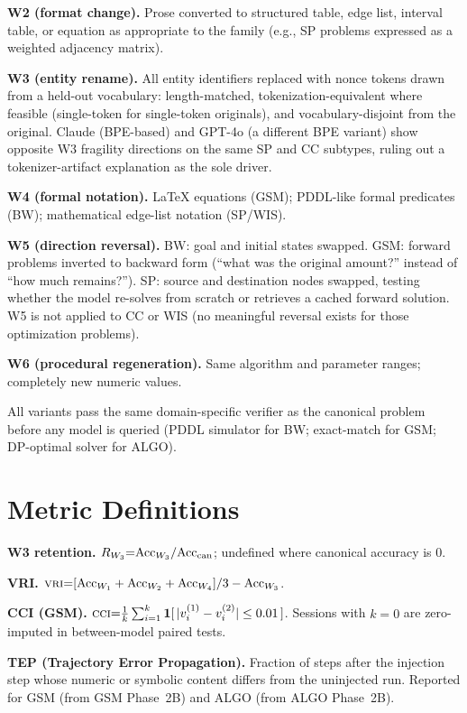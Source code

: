 \textbf{W2 (format change).} Prose converted to structured table, edge list,
interval table, or equation as appropriate to the family (e.g., SP problems
expressed as a weighted adjacency matrix).

\textbf{W3 (entity rename).} All entity identifiers replaced with nonce
tokens drawn from a held-out vocabulary: length-matched,
tokenization-equivalent where feasible (single-token for single-token
originals), and vocabulary-disjoint from the original. Claude (BPE-based) and
GPT-4o (a different BPE variant) show opposite W3 fragility directions on the
same SP and CC subtypes, ruling out a tokenizer-artifact explanation as the
sole driver.

\textbf{W4 (formal notation).} LaTeX equations (GSM); PDDL-like formal
predicates (BW); mathematical edge-list notation (SP/WIS).

\textbf{W5 (direction reversal).} BW: goal and initial states swapped. GSM:
forward problems inverted to backward form (``what was the original amount?''
instead of ``how much remains?''). SP: source and destination nodes swapped,
testing whether the model re-solves from scratch or retrieves a cached
forward solution. W5 is not applied to CC or WIS (no meaningful reversal
exists for those optimization problems).

\textbf{W6 (procedural regeneration).} Same algorithm and parameter ranges;
completely new numeric values.

All variants pass the same domain-specific verifier as the canonical problem
before any model is queried (PDDL simulator for BW; exact-match for GSM;
DP-optimal solver for ALGO).

\section{Metric Definitions}
\label{app:metrics}

\textbf{W3 retention.} $R_{W_3}{=}\mathrm{Acc}_{W_3}/\mathrm{Acc}_{\mathrm{can}}$;
undefined where canonical accuracy is 0.

\textbf{VRI.} $\textsc{vri}{=}[\mathrm{Acc}_{W_1}+\mathrm{Acc}_{W_2}+\mathrm{Acc}_{W_4}]/3 - \mathrm{Acc}_{W_3}$.

\textbf{CCI (GSM).} $\textsc{cci}{=}\frac{1}{k}\sum_{i=1}^{k}
\mathbf{1}[\,|v_i^{(1)}-v_i^{(2)}|\leq 0.01\,]$. Sessions with $k{=}0$ are
zero-imputed in between-model paired tests.

\textbf{TEP (Trajectory Error Propagation).} Fraction of steps after the
injection step whose numeric or symbolic content differs from the uninjected
run. Reported for GSM (from GSM Phase~2B) and ALGO (from ALGO Phase~2B).

